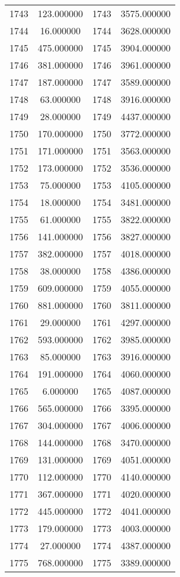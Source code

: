 \documentclass[12pt]{article}
\begin{document}
\begin{longtable}{@{}cccc@{}}
1743 & 123.000000 & 1743 & 3575.000000 \\
1744 & 16.000000 & 1744 & 3628.000000 \\
1745 & 475.000000 & 1745 & 3904.000000 \\
1746 & 381.000000 & 1746 & 3961.000000 \\
1747 & 187.000000 & 1747 & 3589.000000 \\
1748 & 63.000000 & 1748 & 3916.000000 \\
1749 & 28.000000 & 1749 & 4437.000000 \\
1750 & 170.000000 & 1750 & 3772.000000 \\
1751 & 171.000000 & 1751 & 3563.000000 \\
1752 & 173.000000 & 1752 & 3536.000000 \\
1753 & 75.000000 & 1753 & 4105.000000 \\
1754 & 18.000000 & 1754 & 3481.000000 \\
1755 & 61.000000 & 1755 & 3822.000000 \\
1756 & 141.000000 & 1756 & 3827.000000 \\
1757 & 382.000000 & 1757 & 4018.000000 \\
1758 & 38.000000 & 1758 & 4386.000000 \\
1759 & 609.000000 & 1759 & 4055.000000 \\
1760 & 881.000000 & 1760 & 3811.000000 \\
1761 & 29.000000 & 1761 & 4297.000000 \\
1762 & 593.000000 & 1762 & 3985.000000 \\
1763 & 85.000000 & 1763 & 3916.000000 \\
1764 & 191.000000 & 1764 & 4060.000000 \\
1765 & 6.000000 & 1765 & 4087.000000 \\
1766 & 565.000000 & 1766 & 3395.000000 \\
1767 & 304.000000 & 1767 & 4006.000000 \\
1768 & 144.000000 & 1768 & 3470.000000 \\
1769 & 131.000000 & 1769 & 4051.000000 \\
1770 & 112.000000 & 1770 & 4140.000000 \\
1771 & 367.000000 & 1771 & 4020.000000 \\
1772 & 445.000000 & 1772 & 4041.000000 \\
1773 & 179.000000 & 1773 & 4003.000000 \\
1774 & 27.000000 & 1774 & 4387.000000 \\
1775 & 768.000000 & 1775 & 3389.000000 \\

\end{longtable}
\end{document}
